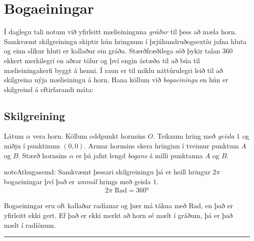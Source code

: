 \documentclass[a4paper,10pt,icelandic]{sphinxmanual}
\begin{document}
\section{Bogaeiningar}
\label{\detokenize{Kafli07:bogaeiningar}}
Í daglegu tali notum við yfirleitt mælieininguna \textit{gráður} til þess að mæla horn.
Samkvæmt skilgreiningu skiptir hún hringnum í þrjúhundruð\sphinxhyphen{}og\sphinxhyphen{}sextíu jafna hluta og einn slíkur hluti er kallaður ein gráða.
Stærðfræðilega séð þykir talan \(360\) ekkert merkilegri en aðrar tölur og því engin ástæða til að búa til mælieiningakerfi byggt á henni.
Í raun er til miklu náttúrulegri leið til að skilgreina nýja mælieiningu á horn.
Hana köllum við \textit{bogaeiningu} en hún er skilgreind á eftirfarandi máta:


\subsection{Skilgreining}
\label{\detokenize{Kafli07:skilgreining}}
Látum \(\alpha\) vera horn. Köllum oddpunkt hornsins \(O\).
Teiknum hring með \textit{geisla} \(1\) og miðju í punktinum \((0,0)\).
Armar hornsins skera hringinn í tveimur punktum \(A\) og \(B\).
Stærð hornsins \(\alpha\) er þá jafnt lengd \textit{bogans} á milli punktanna \(A\) og \(B\).


\begin{sphinxadmonition}{note}{Athugasemd:}
Samkvæmt þessari skilgreiningu þá er heill hringur \(2 \pi\) bogaeiningar því það er \textit{ummál} hrings með geisla \(1\).
\begin{equation*}
\begin{split}2\pi\text{ Rad} = 360°\end{split}
\end{equation*}\end{sphinxadmonition}

Bogaeiningar eru oft kallaðar radíanar og þær má tákna með \(\text{Rad}\), en það er yfirleitt ekki gert. Ef það er ekki merkt að horn sé mælt í gráðum, þá er það mælt í radíönum.


\bigskip\hrule\bigskip
\end{document}
